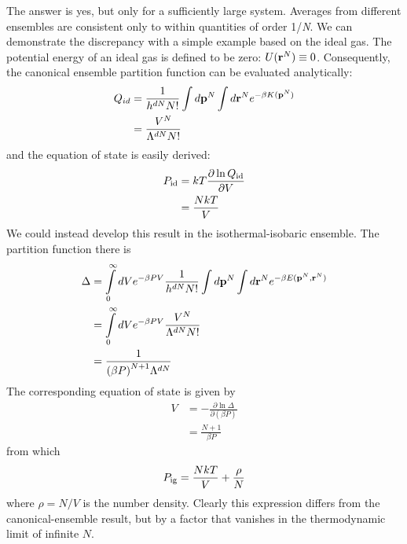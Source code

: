 \documentclass[]{article}
\begin{document}
The answer is yes, but only for a sufficiently large system. Averages
from different ensembles are consistent only to within quantities of
order 1/\emph{N}. We can demonstrate the discrepancy with a simple
example based on the ideal gas. The potential energy of an ideal gas is
defined to be zero: $U({{\bf{r}}^N}) \equiv 0$. Consequently, the canonical ensemble partition
function can be evaluated analytically:
\begin{align*}
{Q_{id}} &= \frac{1}{{{h^{dN}}N!}}\int {d{{\bf{p}}^N}\int {d{{\bf{r}}^N}} {e^{ - \beta K({{\bf{p}}^N})}}} \\
 &= \frac{{{V^N}}}{{{\Lambda ^{dN}}N!}}
\end{align*}
and the equation of state is easily derived:
\begin{align*}
{P_{\rm id}} &= kT\frac{{\partial \ln {Q_{\rm {id}}}}}{{\partial V}}\\
 &= \frac{{NkT}}{V}
\end{align*}
We could instead develop this result in the isothermal-isobaric
ensemble. The partition function there is
\begin{align*}
\Delta  &= \int\limits_0^\infty  {dV{e^{ - \beta PV}}\frac{1}{{{h^{dN}}N!}}\int {d{{\bf{p}}^N}\int {d{{\bf{r}}^N}} {e^{ - \beta E({{\bf{p}}^N},{{\bf{r}}^N})}}} } \\
 &= \int\limits_0^\infty  {dV{e^{ - \beta PV}}\frac{{{V^N}}}{{{\Lambda ^{dN}}N!}}} \\
 &= \frac{1}{{{{(\beta P)}^{N + 1}}{\Lambda ^{dN}}}}
\end{align*}
The corresponding equation of state is given by
\begin{align*}
V &=  - \frac{{\partial \ln \Delta }}{{\partial (\beta P)}}\\
 &= \frac{{N + 1}}{{\beta P}}
\end{align*}
from which
\[{P_{\rm ig}} = \frac{{NkT}}{V} + \frac{\rho }{N}\]
where $\rho = N/V$ is the number density. Clearly this expression differs
from the canonical-ensemble result, but by a factor that vanishes in the
thermodynamic limit of infinite $N$.
\end{document}
